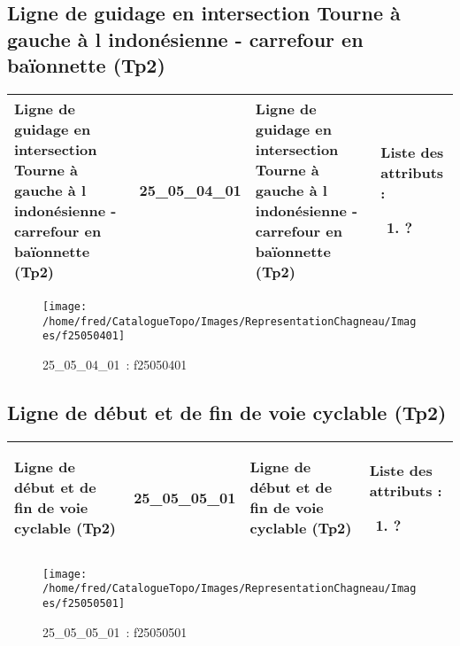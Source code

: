 \documentclass[12pt,titlepage]{book}
\begin{document}
\subsection{Ligne de guidage en intersection Tourne à gauche à l indonésienne - carrefour en baïonnette (Tp2)}
\noindent
\vspace{\baselineskip}

\renewcommand{\arraystretch}{1.2}
\begin{supertabular}{|p{10cm}|c|p{13cm}|p{12cm}|}
 Ligne de guidage en intersection Tourne à gauche à l indonésienne - carrefour en baïonnette (Tp2) & 25\_05\_04\_01 & Ligne de guidage en intersection Tourne à gauche à l indonésienne - carrefour en baïonnette (Tp2) & Liste des attributs :
\begin{enumerate}
  \item ?\end{enumerate}
\\
\hline
\end{supertabular}
\begin{figure}[h!]
  \hfill         %
  \begin{minipage}[t]{3cm}
    \begin{center}
      \texttt{[image: /home/fred/CatalogueTopo/Images/RepresentationChagneau/Images/f25050401]}
      \caption[~25\_05\_04\_01]{\small{25\_05\_04\_01~:} \tiny{f25050401}}\label{f25050401}
    \end{center}
  \end{minipage}
\end{figure}


\subsection{Ligne de début et de fin de voie cyclable (Tp2)}
\noindent
\vspace{\baselineskip}

\renewcommand{\arraystretch}{1.2}
\begin{supertabular}{|p{10cm}|c|p{13cm}|p{12cm}|}
 Ligne de début et de fin de voie cyclable (Tp2) & 25\_05\_05\_01 & Ligne de début et de fin de voie cyclable (Tp2) & Liste des attributs :
\begin{enumerate}
  \item ?\end{enumerate}
\\
\hline
\end{supertabular}
\begin{figure}[h!]
  \hfill         %
  \begin{minipage}[t]{3cm}
    \begin{center}
      \texttt{[image: /home/fred/CatalogueTopo/Images/RepresentationChagneau/Images/f25050501]}
      \caption[~25\_05\_05\_01]{\small{25\_05\_05\_01~:} \tiny{f25050501}}\label{f25050501}
    \end{center}
  \end{minipage}
\end{figure}
\end{document}
